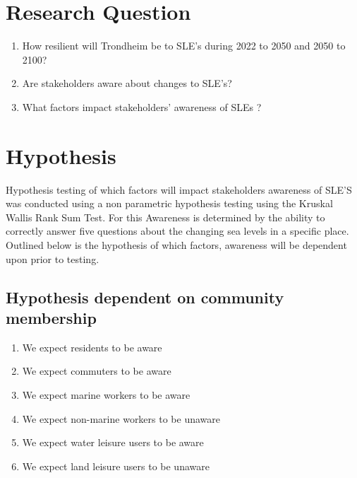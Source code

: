\section{Research Question}
\begin{enumerate}
    \item How resilient will Trondheim be to SLE’s during 2022 to 2050 and 2050 to 2100?
    \item Are stakeholders aware about changes to SLE’s?
    \item What factors impact stakeholders’ awareness of SLEs ?
\end{enumerate}



\section{Hypothesis}
Hypothesis testing  of which factors will impact stakeholders awareness of SLE'S was conducted using a non parametric hypothesis testing using the Kruskal Wallis Rank Sum Test. For this Awareness is determined by the ability to correctly answer five questions about the changing sea levels in a specific place. Outlined below is the hypothesis of which factors, awareness will be dependent upon prior to testing. 

\subsection{Hypothesis dependent on community membership}
\begin{enumerate}
    \item We expect residents to be aware
    \item We expect commuters to be aware
    \item We expect marine workers to be aware
    \item We expect non-marine workers to be unaware
    \item We expect water leisure users to be aware
    \item We expect land leisure users to be unaware
    \end{enumerate}
\paragraph{}


